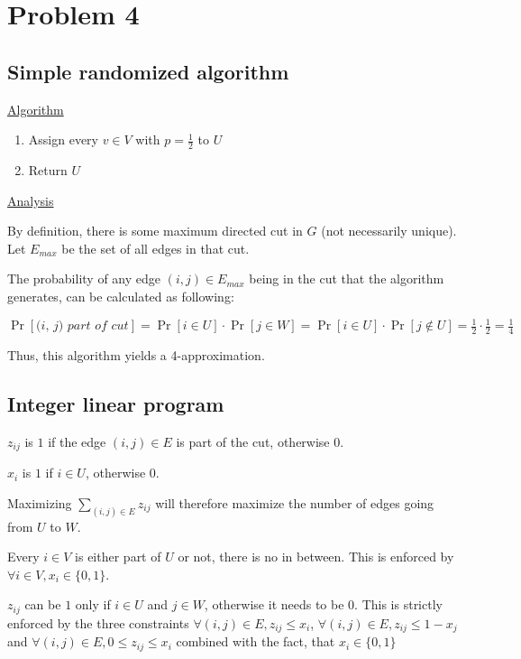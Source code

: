 \section*{Problem 4}

\subsection*{Simple randomized algorithm}

\underline{Algorithm}

\begin{enumerate}
    \item Assign every $v \in V$ with $p = \frac{1}{2}$ to $U$
    \item Return $U$
\end{enumerate}

\underline{Analysis}

By definition, there is some maximum directed cut in $G$ (not necessarily unique).
Let $E_{max}$ be the set of all edges in that cut.

The probability of any edge $(i, j) \in E_{max}$ being in the cut that the algorithm generates, can be calculated as following:

$\Pr[\textit{(i, j) part of cut}] = 
\Pr[i \in U] \cdot \Pr[j \in W] = 
\Pr[i \in U] \cdot \Pr[j \notin U]= 
\frac{1}{2} \cdot \frac{1}{2} = 
\frac{1}{4}$

Thus, this algorithm yields a 4-approximation.

\subsection*{Integer linear program}

$z_{ij}$ is $1$ if the edge $(i, j) \in E$ is part of the cut, otherwise $0$.

$x_i$ is $1$ if $i \in U$, otherwise $0$.

Maximizing $\sum\limits_{(i,j)\in E} z_{ij}$ will therefore maximize the number of edges going from $U$ to $W$.

Every $i \in V$ is either part of $U$ or not, there is no in between. This is enforced by $\forall i \in V, x_i \in \{0, 1\}$.

$z_{ij}$ can be $1$ only if $i \in U$ and $j \in W$, otherwise it needs to be 0. This is strictly enforced by the three constraints $\forall (i, j) \in E, z_{ij} \leq x_i$, $\forall (i, j) \in E, z_{ij} \leq 1 - x_j$ and $\forall (i, j) \in E, 0 \leq z_{ij} \leq x_i$ combined with the fact, that $x_i \in \{0, 1\}$

